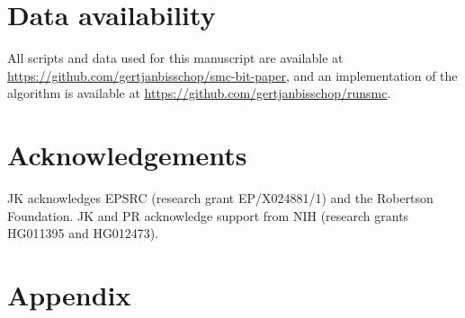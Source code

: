 \documentclass{article}
\newcommand{\tsinfer}[0]{\texttt{tsinfer}}
\newcommand{\argneedle}[0]{\texttt{ARG-Needle}}
\newcommand{\relate}[0]{\texttt{Relate}}
\begin{document}




\section*{Data availability}

All scripts and data used for this manuscript are available at
\url{https://github.com/gertjanbisschop/smc-bit-paper},
and an implementation of the algorithm is available at
\url{https://github.com/gertjanbisschop/runsmc}.

\section*{Acknowledgements}
JK acknowledges EPSRC (research grant EP/X024881/1)
and the Robertson Foundation.
JK and PR acknowledge support from 
NIH (research grants HG011395 and HG012473).

\FloatBarrier



\setcounter{secnumdepth}{2} %

\section*{Appendix}
\appendix
\end{document}
